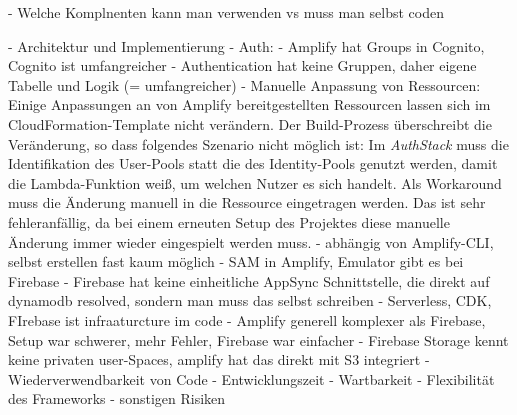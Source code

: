 - Welche Komplnenten kann man verwenden vs muss man selbst coden


- Architektur und Implementierung
  - Auth:
    - Amplify hat Groups in Cognito, Cognito ist umfangreicher
    - Authentication hat keine Gruppen, daher eigene Tabelle und Logik (= umfangreicher)
  - Manuelle Anpassung von Ressourcen: Einige Anpassungen an von Amplify bereitgestellten Ressourcen lassen sich im CloudFormation-Template nicht verändern. Der Build-Prozess überschreibt die Veränderung, so dass folgendes Szenario nicht möglich ist: Im \textit{AuthStack} muss die Identifikation des User-Pools statt die des Identity-Pools genutzt werden, damit die Lambda-Funktion weiß, um welchen Nutzer es sich handelt. Als Workaround muss die Änderung manuell in die Ressource eingetragen werden. Das ist sehr fehleranfällig, da bei einem erneuten Setup des Projektes diese manuelle Änderung immer wieder eingespielt werden muss.
    - abhängig von Amplify-CLI, selbst erstellen fast kaum möglich
 - SAM in Amplify, Emulator gibt es bei Firebase
 - Firebase hat keine einheitliche AppSync Schnittstelle, die direkt auf dynamodb resolved, sondern man muss das selbst schreiben
 - Serverless, CDK, FIrebase ist infraaturcture im code
 - Amplify generell komplexer als Firebase, Setup war schwerer, mehr Fehler, Firebase war einfacher
 - Firebase Storage kennt keine privaten user-Spaces, amplify hat das direkt mit S3 integriert
- Wiederverwendbarkeit von Code
- Entwicklungszeit
- Wartbarkeit
- Flexibilität des Frameworks
- sonstigen Risiken
